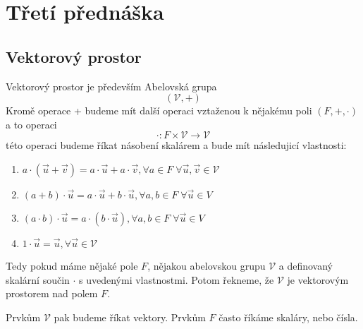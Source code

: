 \section{Třetí přednáška}

\subsection{Vektorový prostor}
\begin{definition}

    Vektorový prostor je především Abelovská grupa
    $$(\mathcal{V}, +)$$
    Kromě operace + budeme mít další operaci vztaženou k nějakému poli $(F, +, \cdot)$
    a to operaci
    $$\cdot: F \times \mathcal{V} \rightarrow \mathcal{V}$$
    této operaci budeme říkat násobení skalárem a bude mít následujicí vlastnosti:
    \begin{enumerate}
        \item $a \cdot (\vec{u} + \vec{v}) = a \cdot \vec{u} + a \cdot \vec{v}, \forall
            a \in F \; \forall \vec{u}, \vec{v} \in \mathcal{V}$
        \item $(a + b) \cdot \vec{u} = a \cdot \vec{u} + b \cdot \vec{u},
            \forall a,b \in F \; \forall \vec{u} \in V$
        \item $(a \cdot b ) \cdot \vec{u} = a \cdot (b \cdot \vec{u}),
            \forall a,b \in F \; \forall \vec{u} \in V$
        \item $1 \cdot \vec{u} = \vec{u}, \forall \vec{u} \in \mathcal{V}$
    \end{enumerate}
    Tedy pokud máme nějaké pole $F$, nějakou abelovskou grupu $\mathcal{V}$ a definovaný
    skalární součin $\cdot$ s uvedenými vlastnostmi. Potom řekneme, že $\mathcal{V}$ je
    vektorovým prostorem nad polem $F$.

    Prvkům $\mathcal{V}$ pak budeme říkat vektory. Prvkům $F$ často říkáme skaláry,
    nebo čísla.
    \label{def:vector_space}
\end{definition}
